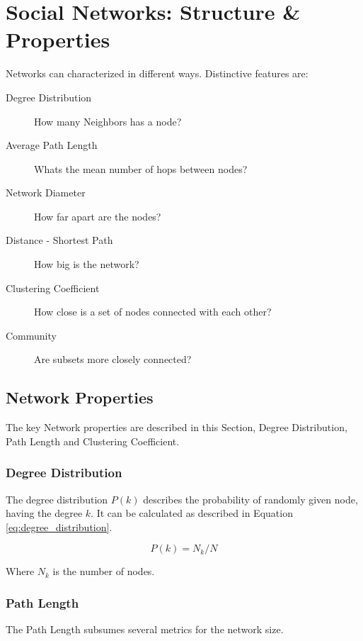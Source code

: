\section{Social Networks: Structure \& Properties} %
\label{sec:social_networks_structure_&_properties}

Networks can characterized in different ways.
Distinctive features are:\\
\begin{description}
	\item[Degree Distribution] How many Neighbors has a node?
	\item[Average Path Length] Whats the mean number of hops between nodes?
	\item[Network Diameter] How far apart are the nodes?
	\item[Distance - Shortest Path] How big is the network?
	\item[Clustering Coefficient] How close is a set of nodes connected with each other?
	\item[Community] Are subsets more closely connected?
\end{description}

\subsection{Network Properties} %
\label{sub:network_properties}
	The key Network properties are described in this Section,
	Degree Distribution, Path Length and Clustering Coefficient.

	\subsubsection{Degree Distribution} %
	\label{ssub:degree_distribution}
	The degree distribution $P(k)$ describes the probability of randomly given node,
	having the degree $k$.
	It can be calculated as described in Equation \ref{eq:degree_distribution}.

	\begin{equation}
	\label{eq:degree_distribution}
		P(k) = N_k / N
	\end{equation}

	Where $N_k$ is the number of nodes.

	\subsubsection{Path Length} %
	\label{ssub:path_length}
		The Path Length subsumes several metrics for the network size.
